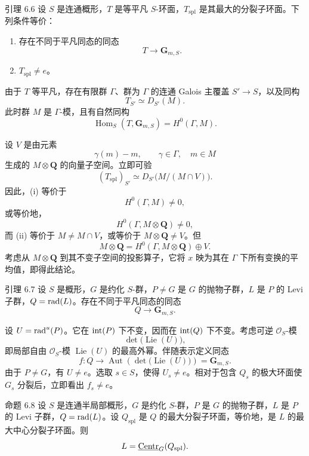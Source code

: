 \begin{sgastatement}{引理 6.6}
设 \(S\) 是连通概形，\(T\) 是等平凡 \(S\)-环面，\(T_{\mathrm{spl}}\) 是其最大的分裂子环面。下列条件等价：
\begin{enumerate}[label=\textup{(\roman*)}]
\item 存在不同于平凡同态的同态
\[
 T\longrightarrow\mathbf G_{m,S}.
\]
\item \(T_{\mathrm{spl}}\ne e\)。
\end{enumerate}
\end{sgastatement}

由于 \(T\) 等平凡，存在有限群 \(\Gamma\)、群为 \(\Gamma\) 的连通 Galois 主覆盖 \(S'\to S\)，以及同构
\[
 T_{S'}\simeq D_{S'}(M).
\]
此时群 \(M\) 是 \(\Gamma\)-模，且有自然同构
\[
 \operatorname{Hom}_S(T,\mathbf G_{m,S})
   =H^0(\Gamma,M).
\]

设 \(V\) 是由元素
\[
 \gamma(m)-m,\qquad \gamma\in\Gamma,\quad m\in M
\]
生成的 \(M\otimes\mathbf Q\) 的向量子空间。立即可验
\[
 (T_{\mathrm{spl}})_{S'}
   \simeq D_{S'}\bigl(M/(M\cap V)\bigr).
\]
因此，\textup{(i)} 等价于
\[
 H^0(\Gamma,M)\ne0,
\]
或等价地，
\[
 H^0(\Gamma,M\otimes\mathbf Q)\ne0,
\]
而 \textup{(ii)} 等价于 \(M\ne M\cap V\)，或等价于 \(M\otimes\mathbf Q\ne V\)。但
\[
 M\otimes\mathbf Q
 =H^0(\Gamma,M\otimes\mathbf Q)\oplus V.
\]
考虑从 \(M\otimes\mathbf Q\) 到其不变子空间的投影算子，它将 \(x\) 映为其在 \(\Gamma\) 下所有变换的平均值，即得此结论。

\begin{sgastatement}{引理 6.7}
设 \(S\) 是概形，\(G\) 是约化 \(S\)-群，\(P\ne G\) 是 \(G\) 的抛物子群，\(L\) 是 \(P\) 的 Levi 子群，\(Q=\operatorname{rad}(L)\)。存在不同于平凡同态的同态
\[
 Q\longrightarrow\mathbf G_{m,S}.
\]
\end{sgastatement}

设 \(U=\operatorname{rad}^u(P)\)。它在 \(\operatorname{int}(P)\) 下不变，因而在 \(\operatorname{int}(Q)\) 下不变。考虑可逆 \(\mathcal O_S\)-模
\[
 \det\bigl(\operatorname{Lie}(U)\bigr),
\]
即局部自由 \(\mathcal O_S\)-模 \(\operatorname{Lie}(U)\) 的最高外幂。伴随表示定义同态
\[
 f:Q\longrightarrow
 \operatorname{Aut}\!\left(\det\bigl(\operatorname{Lie}(U)\bigr)\right)
 =\mathbf G_{m,S}.
\]
由于 \(P\ne G\)，有 \(U\ne e\)。选取 \(s\in S\)，使得 \(U_s\ne e\)。相对于包含 \(Q_s\) 的极大环面使 \(G_s\) 分裂后，立即看出 \(f_s\ne e\)。

\begin{sgastatement}{命题 6.8}
设 \(S\) 是连通半局部概形，\(G\) 是约化 \(S\)-群，\(P\) 是 \(G\) 的抛物子群，\(L\) 是 \(P\) 的 Levi 子群，\(Q=\operatorname{rad}(L)\)。设 \(Q_{\mathrm{spl}}\) 是 \(Q\) 的最大分裂子环面，等价地，是 \(L\) 的最大中心分裂子环面。则
\[
 L=\underline{\operatorname{Centr}}_G(Q_{\mathrm{spl}}).
\]
\end{sgastatement}

